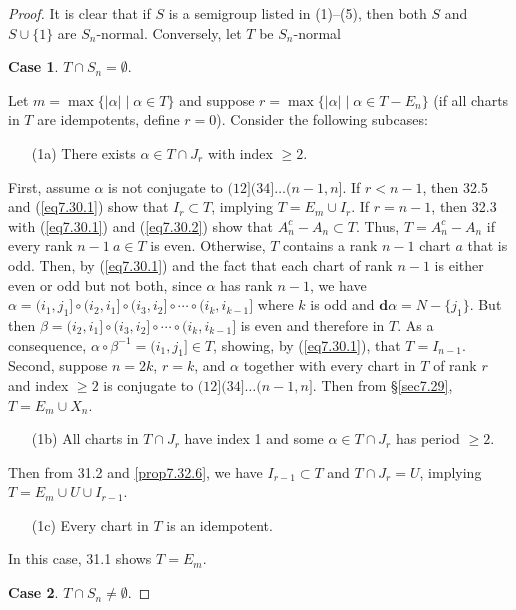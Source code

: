 \documentclass{surv-l}
\numberwithin{equation}{section}
\numberwithin{table}{section}
\numberwithin{figure}{section}
\theoremstyle{definition}
\begin{document}
\begin{proof} It is clear that if $S$ is a semigroup listed in (1)--(5),
then both $S$ and $S \cup\{1\}$ are $S_{n}$-normal.
Conversely, let $T$ be $S_{n}$-normal

\noindent \textbf{Case 1}. $T\cap S_{n}=\emptyset$.

\noindent Let $m=\max\{|\alpha|\mid \alpha\in T\}$ and suppose
$r=\max\{|\alpha|\mid \alpha\in T-E_{n}\}$ (if all charts in
$T$ are idempotents, define $r=0$). Consider the following
subcases:
\begin{enumerate}
\item[(1a)] There exists $\alpha\in T\cap J_{r}$ with index $\geq 2$.
\end{enumerate}
First, assume $\alpha$ is not conjugate to $(12](34]\ldots (n-1,
n]$. If $r<n -1$, then 32.5 and (\ref{eq7.30.1}) show that
$I_{r}\subset T$, implying $T=E_{m}\cup I_{r}$. If $r=n-1$, then
32.3 with (\ref{eq7.30.1}) and (\ref{eq7.30.2}) show that
$A_{n}^{c}-A_{n}\subset T$. Thus, $T=A_{n}^{c}-A_{n}$ if every
rank $n-1\ a \in T$ is even. Otherwise, $T$ contains a rank $n-1$
chart $a$ that is odd. Then, by (\ref{eq7.30.1}) and the fact that
each chart of rank $n -1$ is either even or odd but not both,
since $\alpha$ has rank $n -1$, we have
$\alpha=(i_{1},j_{1}]\circ(i_{2}, i_{1}]\circ(i_{3},
i_{2}]\circ\cdots\circ(i_{k}, i_{k-1}]$ where $k$ is odd and
$\mathbf{d}\alpha=N-\{j_{1}\}$. But then $\beta=(i_{2},
i_{1}]\circ(i_{3}, i_{2}]\circ\cdots \circ (i_{k}, i_{k-1}]$ is
even and therefore in $T$. As a consequence,
$\alpha\circ\beta^{-1}=(i_{1}, j_{1}]\in T$, showing, by
(\ref{eq7.30.1}), that $T=I_{n-1}$. Second, suppose $n =2k$, $r=k$,
and $\alpha$ together with every chart in $T$ of rank $r$ and
index $\geq 2$ is conjugate to $(12](34]\ldots (n-1, n]$. Then
from \S\ref{sec7.29}, $T=E_{m}\cup X_{n}$.
\begin{enumerate}
\item[(1b)] All charts in $T\cap J_{r}$ have index 1 and some $\alpha\in
T\cap J_{r}$ has period $\geq 2$.
\end{enumerate}
Then from 31.2 and \ref{prop7.32.6}, we have $I_{r-1}\subset T$
and $T\cap J_{r}=U$, implying $T=E_{m}\cup U\cup I_{r-1}$.
\begin{enumerate}
\item[(1c)] Every chart in $T$ is an idempotent.
\end{enumerate}
In this case, 31.1 shows $T=E_{m}$.

\noindent \textbf{Case 2}. $T\cap S_{n}\neq\emptyset$.


\end{proof}
\end{document}
